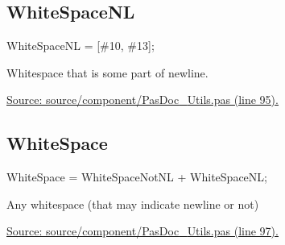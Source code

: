 \documentclass{report}
\newif\ifpdf
\begin{document}
\subsection*{WhiteSpaceNL}
\fi
\label{PasDoc_Utils-WhiteSpaceNL}
\begin{list}{}{
\setlength{\itemindent}{0cm}
\setlength{\listparindent}{0cm}
\setlength{\leftmargin}{\evensidemargin}
\addtolength{\leftmargin}{\tmplength}
\settowidth{\labelsep}{X}
\addtolength{\leftmargin}{\labelsep}
\setlength{\labelwidth}{\tmplength}
}
\item[\textbf{Declaration}\hfill]
\ifpdf
\begin{flushleft}
\fi
\begin{ttfamily}
WhiteSpaceNL = [{\#}10, {\#}13];\end{ttfamily}

\ifpdf
\end{flushleft}
\fi

\par
\item[\textbf{Description}]
Whitespace that is some part of newline.\par
\href{https://github.com/pasdoc/pasdoc/blob/master/source/component/PasDoc_Utils.pas#L95}{Source: source/component/PasDoc{\_}Utils.pas (line 95).}

\end{list}
\ifpdf
\subsection*{\large{\textbf{WhiteSpace}}\normalsize\hspace{1ex}\hrulefill}
\else
\subsection*{WhiteSpace}
\fi
\label{PasDoc_Utils-WhiteSpace}
\begin{list}{}{
\setlength{\itemindent}{0cm}
\setlength{\listparindent}{0cm}
\setlength{\leftmargin}{\evensidemargin}
\addtolength{\leftmargin}{\tmplength}
\settowidth{\labelsep}{X}
\addtolength{\leftmargin}{\labelsep}
\setlength{\labelwidth}{\tmplength}
}
\item[\textbf{Declaration}\hfill]
\ifpdf
\begin{flushleft}
\fi
\begin{ttfamily}
WhiteSpace = WhiteSpaceNotNL + WhiteSpaceNL;\end{ttfamily}

\ifpdf
\end{flushleft}
\fi

\par
\item[\textbf{Description}]
Any whitespace (that may indicate newline or not)\par
\href{https://github.com/pasdoc/pasdoc/blob/master/source/component/PasDoc_Utils.pas#L97}{Source: source/component/PasDoc{\_}Utils.pas (line 97).}

\end{list}
\ifpdf
\end{document}
